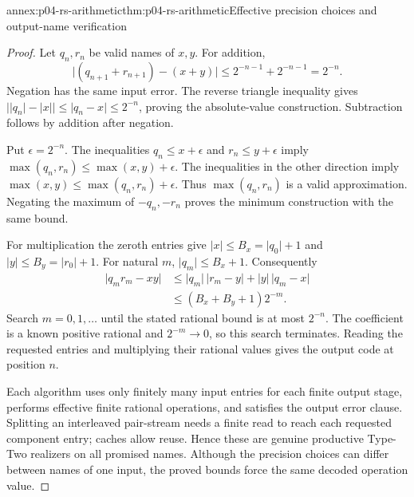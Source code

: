 \begin{annexitem}{annex:p04-rs-arithmetic}{thm:p04-rs-arithmetic}{Effective precision choices and output-name verification}
\begin{proof}
Let \(q_n,r_n\) be valid names of \(x,y\).
For addition,
\[
 \lvert(q_{n+1}+r_{n+1})-(x+y)\rvert
 \leq2^{-n-1}+2^{-n-1}=2^{-n}.
\]
Negation has the same input error. The reverse triangle
inequality gives
\(\bigl|\lvert q_n\rvert-\lvert x\rvert\bigr|
\leq\lvert q_n-x\rvert\leq2^{-n}\), proving the absolute-value
construction. Subtraction follows by addition after negation.

Put \(\epsilon=2^{-n}\).
The inequalities \(q_n\leq x+\epsilon\) and
\(r_n\leq y+\epsilon\) imply
\(\max(q_n,r_n)\leq\max(x,y)+\epsilon\).
The inequalities in the other direction imply
\(\max(x,y)\leq\max(q_n,r_n)+\epsilon\).
Thus \(\max(q_n,r_n)\) is a valid approximation.
Negating the maximum of \(-q_n,-r_n\) proves the minimum
construction with the same bound.

For multiplication the zeroth entries give
\(\lvert x\rvert\leq B_x=\lvert q_0\rvert+1\) and
\(\lvert y\rvert\leq B_y=\lvert r_0\rvert+1\).
For natural \(m\), \(\lvert q_m\rvert\leq B_x+1\).
Consequently
\[
 \begin{split}
 \lvert q_mr_m-xy\rvert
 &\leq \lvert q_m\rvert\,\lvert r_m-y\rvert
       +\lvert y\rvert\,\lvert q_m-x\rvert\\
 &\leq(B_x+B_y+1)2^{-m}.
 \end{split}
\]
Search \(m=0,1,\ldots\) until the stated rational bound is
at most \(2^{-n}\). The coefficient is a known positive
rational and \(2^{-m}\to0\), so this search terminates.
Reading the requested entries and multiplying their rational
values gives the output code at position \(n\).

Each algorithm uses only finitely many input entries for
each finite output stage, performs effective finite rational
operations, and satisfies the output error clause.
Splitting an interleaved pair-stream needs a finite read to
reach each requested component entry; caches allow reuse.
Hence these are genuine productive Type-Two realizers on
all promised names. Although the precision choices can
differ between names of one input, the proved bounds force
the same decoded operation value.
\end{proof}
\end{annexitem}


